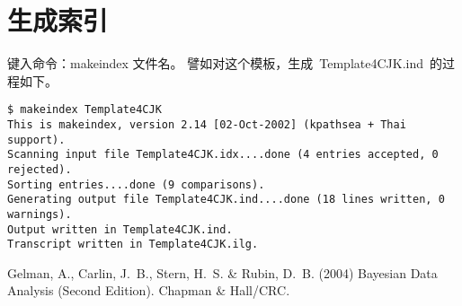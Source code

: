 \documentclass[a4paper,11pt,         %
               twoside,              %
               ]{article}
\begin{document}
\section{生成索引}
键入命令：makeindex  文件名。\newline
\indent 譬如对这个模板，生成~Template4CJK.ind~的过程如下。
\begin{lstlisting}
$ makeindex Template4CJK
This is makeindex, version 2.14 [02-Oct-2002] (kpathsea + Thai support).
Scanning input file Template4CJK.idx....done (4 entries accepted, 0 rejected).
Sorting entries....done (9 comparisons).
Generating output file Template4CJK.ind....done (18 lines written, 0 warnings).
Output written in Template4CJK.ind.
Transcript written in Template4CJK.ilg.
\end{lstlisting}

\printindex %
\begin{thebibliography}{}
 Gelman, A., Carlin, J.~B., Stern, H.~S.  \& Rubin, D.~B. (2004)
Bayesian Data Analysis (Second Edition).  \newblock Chapman \& Hall/CRC.
\end{thebibliography}
\clearpage
\end{document}
